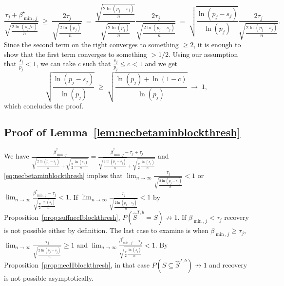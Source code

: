 \documentclass[aos]{imsart}
\theoremstyle{plain}
\begin{document}
$$
\frac{\tau_j+\beta^\star_{\min,j}}{\sqrt{\tfrac{2\ln(s_j/c)}{n}}}\;\geq\;\frac{2\tau_j}{\sqrt{\tfrac{2\ln(p_j)}{n}}}\;=\;\frac{\sqrt{\tfrac{2\ln(p_j-s_j)}{n}}}{\sqrt{\tfrac{2\ln(p_j)}{n}}}\frac{2\tau_j}{\sqrt{\tfrac{2\ln(p_j-s_j)}{n}}}\;=\;\sqrt{\frac{\ln(p_j-s_j)}{\ln(p_j)}}\frac{2\tau_j}{\sqrt{\tfrac{2\ln(p_j-s_j)}{n}}}.
$$
Since the second term on the right converges to something $\geq 2$, it is enough to show that the first term converges to something $>1/2$. Using our assumption that $\tfrac{s_j}{p_j}<1$, we can take $c$ such that $\tfrac{s_j}{p_j}\leq c<1$ and we get
$$
\sqrt{\frac{\ln(p_j-s_j)}{\ln(p_j)}}\;\geq\;\sqrt{\frac{\ln(p_j)+\ln(1-c)}{\ln(p_j)}}\;\to\;1,
$$
which concludes the proof.

\subsection{Proof of Lemma~\ref{lem:necbetaminblockthresh}}
    We have $\frac{\beta_{\min,j}^*}{\sqrt{\tfrac{2\ln(p_j-s_j)}{n}}+\sqrt{\tfrac{\pi}{2}\tfrac{\ln(s_j)}{n}}}= \frac{\beta_{\min,j}^*-\tau_j+\tau_j}{\sqrt{\tfrac{2\ln(p_j-s_j)}{n}}+\sqrt{\tfrac{\pi}{2}\tfrac{\ln(s_j)}{n}}}$ and \eqref{eq:necbetaminblockthresh} implies that $\lim_{n\to \infty}\frac{\tau_j}{\sqrt{\tfrac{2\ln(p_j-s_j)}{n}}} <1$ or $\lim_{n\to \infty}\frac{\beta_{\min,j}^*-\tau_j}{\sqrt{\tfrac{\pi}{2}\tfrac{\ln(s_j)}{n}}} <1$. 
    If $\lim_{n\to \infty}\frac{\tau_j}{\sqrt{\tfrac{2\ln(p_j-s_j)}{n}}} <1$ by Proposition~\ref{prop:suffnecIblockthresh}, $P(\hat{S}^{T,b} = S)\not \to 1$. If $\beta_{\min,j}<\tau_j$ recovery is not possible either by definition. 
    The last case to examine is when $\beta_{\min,j}\geq\tau_j$, $\lim_{n\to \infty}\frac{\tau_j}{\sqrt{\tfrac{2\ln(p_j-s_j)}{n}}} \geq 1$ and $\lim_{n\to \infty}\frac{\beta_{\min,j}^*-\tau_j}{\sqrt{\tfrac{\pi}{2}\tfrac{\ln(s_j)}{n}}} <1$. By Proposition~\ref{prop:necIIblockthresh}, in that case $P(S \subseteq \hat{S}^{T,b} )\not \to 1$ and recovery is not possible asymptotically.
\end{document}
